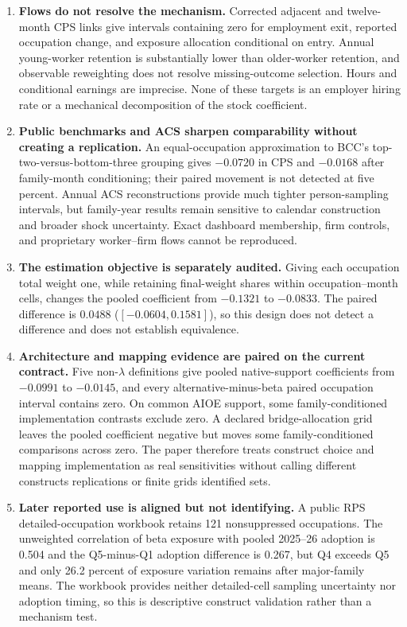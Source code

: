 \documentclass[11pt,letterpaper]{article}
\begin{document}
\begin{enumerate}[leftmargin=1.8em]
\item \textbf{Flows do not resolve the mechanism.}  Corrected adjacent and twelve-month CPS links give intervals containing zero for employment exit, reported occupation change, and exposure allocation conditional on entry.  Annual young-worker retention is substantially lower than older-worker retention, and observable reweighting does not resolve missing-outcome selection.  Hours and conditional earnings are imprecise.  None of these targets is an employer hiring rate or a mechanical decomposition of the stock coefficient.
\item \textbf{Public benchmarks and ACS sharpen comparability without creating a replication.}  An equal-occupation approximation to BCC's top-two-versus-bottom-three grouping gives $-0.0720$ in CPS and $-0.0168$ after family-month conditioning; their paired movement is not detected at five percent.  Annual ACS reconstructions provide much tighter person-sampling intervals, but family-year results remain sensitive to calendar construction and broader shock uncertainty.  Exact dashboard membership, firm controls, and proprietary worker--firm flows cannot be reproduced.
\item \textbf{The estimation objective is separately audited.}  Giving each occupation total weight one, while retaining final-weight shares within occupation--month cells, changes the pooled coefficient from $-0.1321$ to $-0.0833$.  The paired difference is $0.0488$ ($[-0.0604,0.1581]$), so this design does not detect a difference and does not establish equivalence.
\item \textbf{Architecture and mapping evidence are paired on the current contract.}  Five non-$\lambda$ definitions give pooled native-support coefficients from $-0.0991$ to $-0.0145$, and every alternative-minus-beta paired occupation interval contains zero.  On common AIOE support, some family-conditioned implementation contrasts exclude zero.  A declared bridge-allocation grid leaves the pooled coefficient negative but moves some family-conditioned comparisons across zero.  The paper therefore treats construct choice and mapping implementation as real sensitivities without calling different constructs replications or finite grids identified sets.
\item \textbf{Later reported use is aligned but not identifying.}  A public RPS detailed-occupation workbook retains 121 nonsuppressed occupations.  The unweighted correlation of beta exposure with pooled 2025--26 adoption is 0.504 and the Q5-minus-Q1 adoption difference is 0.267, but Q4 exceeds Q5 and only 26.2 percent of exposure variation remains after major-family means.  The workbook provides neither detailed-cell sampling uncertainty nor adoption timing, so this is descriptive construct validation rather than a mechanism test.

\end{enumerate}
\end{document}

